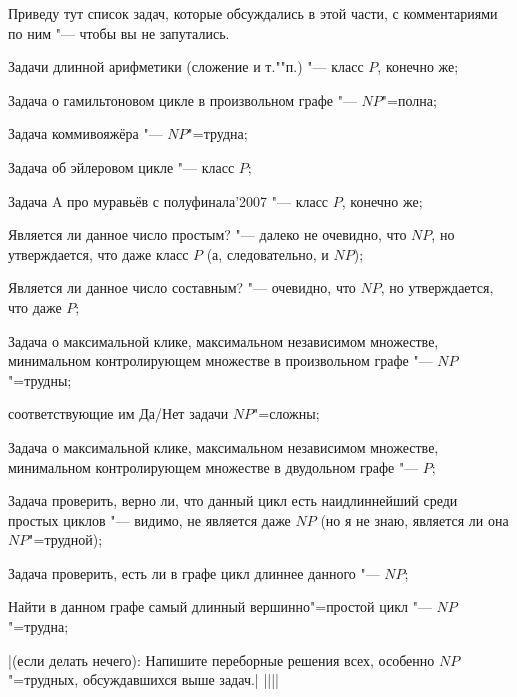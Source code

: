 \documentclass[a4paper,10pt]{problems}
\begin{document}
 Приведу тут список задач, которые обсуждались в этой 
части, с комментариями по ним "--- чтобы вы не запутались.
\begin{ulist}
\item Задачи длинной арифметики (сложение и т.""п.) "--- класс $P$, конечно же;
\item Задача о гамильтоновом цикле в произвольном графе "--- $NP$"=полна;
\item Задача коммивояжёра "--- $NP$"=трудна;
\item Задача об эйлеровом цикле "--- класс $P$;
\item Задача A про муравьёв с полуфинала'2007 "--- класс $P$, конечно же;
\item Является ли данное число простым? "--- далеко не очевидно, что $NP$, но 
утверждается, что даже класс $P$ (а, следовательно, и $NP$);
\item Является ли данное число составным? "--- очевидно, что $NP$, но 
утверждается, что даже $P$;
\item Задача о максимальной клике, максимальном независимом множестве, 
минимальном контролирующем множестве в произвольном графе "--- $NP$"=трудны;

соответствующие им Да/Нет задачи $NP$"=сложны;
\item Задача о максимальной клике, максимальном независимом множестве, 
минимальном контролирующем множестве в двудольном графе "--- $P$;
\item Задача проверить, верно ли, что данный цикл есть наидлиннейший среди 
простых циклов "--- видимо, не является даже $NP$ (но я не знаю, является ли она $NP$"=трудной);
\item Задача проверить, есть ли в графе цикл длиннее данного "--- $NP$;
\item Найти в данном графе самый длинный вершинно"=простой цикл "--- $NP$"=трудна;
\end{ulist}

|(если делать нечего): Напишите переборные решения всех, особенно $NP$"=трудных, обсуждавшихся выше задач.|
||||

\immediate\closeout\tsk
\immediate\closeout\hnt
\immediate\closeout\ans
\eject{}

\eject{}

\end{document}
